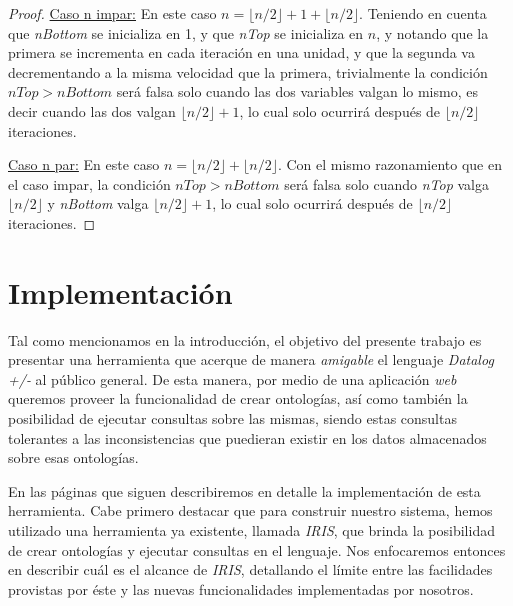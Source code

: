 \documentclass[11pt,a4paper,twoside]{tesis}
\newcommand{\parteEntera}{\lfloor n/2 \rfloor}
\begin{document}
\begin{proof}
\underline{Caso n impar:} En este caso $n = \parteEntera + 1 + \parteEntera$. Teniendo en cuenta que \textit{nBottom} se inicializa en 1, y que \textit{nTop} se inicializa en $n$, y notando que la primera se incrementa en cada iteración en una unidad, y que la segunda va decrementando a la misma velocidad que la primera, trivialmente la condición $nTop > nBottom$ será falsa solo cuando las dos variables valgan lo mismo, es decir cuando las dos valgan $\parteEntera + 1$, lo cual solo ocurrirá después de $\parteEntera$ iteraciones. 

\underline{Caso n par:} En este caso $n = \parteEntera + \parteEntera$. Con el mismo razonamiento que en el caso impar, la condición $nTop > nBottom$ será falsa solo cuando \textit{nTop} valga $\parteEntera$ y \textit{nBottom} valga $\parteEntera + 1$, lo cual solo ocurrirá después de $\parteEntera$ iteraciones. 

\end{proof}

















\chapter{Implementación}

Tal como mencionamos en la introducción, el objetivo del presente trabajo es presentar una herramienta que acerque de manera \textit{amigable} el lenguaje \textit{Datalog +/-} al público general. De esta manera, por medio de una aplicación \textit{web} queremos proveer la funcionalidad de crear ontologías, así como también la posibilidad de ejecutar consultas sobre las mismas, siendo estas consultas tolerantes a las inconsistencias que puedieran existir en los datos almacenados sobre esas ontologías. 

En las páginas que siguen describiremos en detalle la implementación de esta herramienta. Cabe primero destacar que para construir nuestro sistema, hemos utilizado una herramienta ya existente, llamada \textit{IRIS}, que brinda la posibilidad de crear ontologías y ejecutar consultas en el lenguaje. Nos enfocaremos entonces en describir cuál es el alcance de \textit{IRIS}, detallando el límite entre las facilidades provistas por éste y las nuevas funcionalidades implementadas por nosotros.
\end{document}
